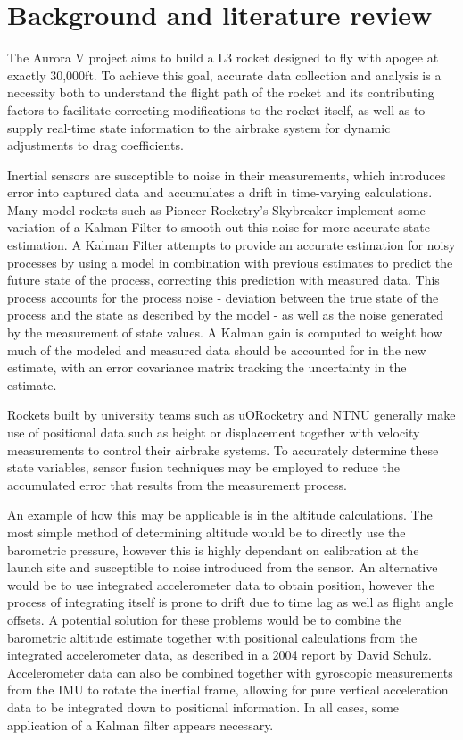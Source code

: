 \section{Background and literature review}\label{sec:lit-review}
The Aurora V project aims to build a L3 rocket designed to fly with apogee at exactly 30,000ft. To achieve this goal, accurate data collection and analysis is a necessity both to understand the flight path of the rocket and its contributing factors to facilitate correcting modifications to the rocket itself, as well as to supply real-time state information to the airbrake system for dynamic adjustments to drag coefficients.

Inertial sensors are susceptible to noise in their measurements, which introduces error into captured data and accumulates a drift in time-varying calculations. Many model rockets such as Pioneer Rocketry's Skybreaker\cite{pioneer-rocketry} implement some variation of a Kalman Filter to smooth out this noise for more accurate state estimation. A Kalman Filter attempts to provide an accurate estimation for noisy processes by using a model in combination with previous estimates to predict the future state of the process, correcting this prediction with measured data\cite{kalman-introduction,kalman1960}. This process accounts for the process noise - deviation between the true state of the process and the state as described by the model - as well as the noise generated by the measurement of state values. A Kalman gain is computed to weight how much of the modeled and measured data should be accounted for in the new estimate, with an error covariance matrix tracking the uncertainty in the estimate.

Rockets built by university teams such as uORocketry and NTNU generally make use of positional data such as height or displacement together with velocity measurements to control their airbrake systems\cite{uORocketry, NTNU}. To accurately determine these state variables, sensor fusion techniques may be employed to reduce the accumulated error that results from the measurement process. 

An example of how this may be applicable is in the altitude calculations. The most simple method of determining altitude would be to directly use the barometric pressure, however this is highly dependant on calibration at the launch site and susceptible to noise introduced from the sensor. An alternative would be to use integrated accelerometer data to obtain position, however the process of integrating itself is prone to drift due to time lag as well as flight angle offsets. A potential solution for these problems would be to combine the barometric altitude estimate together with positional calculations from the integrated accelerometer data, as described in a 2004 report by David Schulz\cite{kalman-apogee}. Accelerometer data can also be combined together with gyroscopic measurements from the IMU to rotate the inertial frame, allowing for pure vertical acceleration data to be integrated down to positional information. In all cases, some application of a Kalman filter appears necessary.


